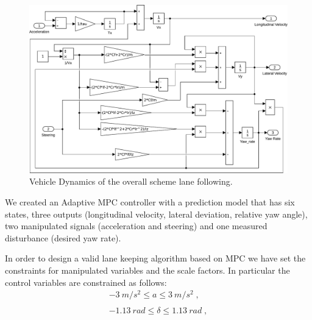 \begin{figure}[!h]
	\centering
	\includegraphics[width=\textwidth]{../figure/lane_following_AMPC_vehicle_dynamics.pdf}
	\caption{Vehicle Dynamics of the overall scheme lane following.}
	\label{fig:scheme_lane_following_vehicle_dynamics}
\end{figure}
We created an Adaptive MPC controller with a prediction model that has six states, three outputs (longitudinal velocity, lateral deviation, relative yaw angle), two manipulated signals (acceleration and steering) and one measured disturbance (desired yaw rate).

In order to design a valid lane keeping algorithm based on MPC we have set the constraints for manipulated variables and the scale factors. In particular the control
variables are constrained as follows:
\begin{equation}
\label{eqn:constraint_LKA}
\begin{array}{cc}
	\SI{-3}{m/s^2}\leq a\leq\SI{3}{m/s^2}\;,\\\\
	\SI{-1.13}{rad}\leq \delta \leq \SI{1.13}{rad}\;,
\end{array}
\end{equation}

